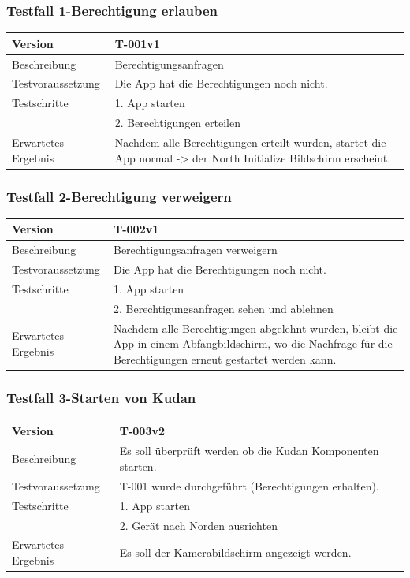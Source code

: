 \documentclass[a4paper]{scrreprt}
\begin{document}
\subsubsection{Testfall 1-Berechtigung erlauben}
\begin{tabularx}{\textwidth}{|l|X|}
\hline
	Version &
	T-001v1 \\
\hline
	Beschreibung & Berechtigungsanfragen \\
\hline
	Testvoraussetzung & Die App hat die Berechtigungen noch nicht. \\
\hline
	Testschritte &
		1. App starten \\ &
		2. Berechtigungen erteilen \\
\hline
	Erwartetes Ergebnis & Nachdem alle Berechtigungen erteilt wurden, startet die App normal -> der North Initialize Bildschirm erscheint. \\
\hline
\end{tabularx}
\subsubsection{Testfall 2-Berechtigung verweigern}
\begin{tabularx}{\textwidth}{|l|X|}
\hline
	Version &
	T-002v1 \\
\hline
	Beschreibung & Berechtigungsanfragen verweigern \\
\hline
	Testvoraussetzung & Die App hat die Berechtigungen noch nicht. \\
\hline
	Testschritte &
		1. App starten \\ &
		2. Berechtigungsanfragen sehen und ablehnen \\
\hline
	Erwartetes Ergebnis & Nachdem alle Berechtigungen abgelehnt wurden, bleibt die App in einem Abfangbildschirm, wo die Nachfrage für die Berechtigungen erneut gestartet werden kann. \\
\hline
\end{tabularx}
\subsubsection{Testfall 3-Starten von Kudan}
\begin{tabularx}{\textwidth}{|l|X|}
\hline
	Version &
	T-003v2 \\
\hline
	Beschreibung &
	Es soll überprüft werden ob die Kudan Komponenten starten.\\
\hline
	Testvoraussetzung &
	T-001 wurde durchgeführt (Berechtigungen erhalten). \\
\hline
	Testschritte &
		1. App starten \\ &
		2. Gerät nach Norden ausrichten \\
\hline
	Erwartetes Ergebnis &
	Es soll der Kamerabildschirm angezeigt werden. \\
\hline
\end{tabularx}
\end{document}
